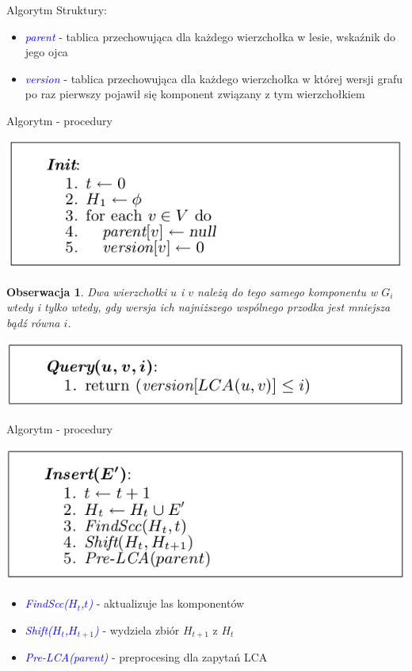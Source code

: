 \documentclass{beamer}
\newtheorem{obs}{Obserwacja}
\newcommand{\emp}[1]{\textcolor{blue}{\textit{#1}}}
\begin{document}
\begin{frame}{Algorytm}
Struktury:
\begin{itemize}
\item \emp{parent} - tablica przechowująca dla każdego wierzchołka w lesie, wskaźnik do jego ojca
\item \emp{version} - tablica przechowująca dla każdego wierzchołka w której wersji grafu po raz pierwszy pojawił się komponent związany z tym wierzchołkiem
\end{itemize}
\end{frame}

\begin{frame}{Algorytm - procedury}
\begin{center}
\includegraphics[scale=0.4]{img/Init.png}
\end{center}

\begin{obs}
Dwa wierzchołki $u$ i $v$ należą do tego samego komponentu w $G_i$ wtedy i tylko wtedy, gdy wersja ich najniższego wspólnego przodka jest mniejsza bądź równa $i$.
\end{obs}

\begin{center}
\includegraphics[scale=0.4]{img/Query.png}
\end{center}
\end{frame}

\begin{frame}{Algorytm - procedury}
\begin{center}
\includegraphics[scale=0.4]{img/Insert.png}
\end{center}

\begin{itemize}
\item \emp{FindScc($H_t$,$t$)} - aktualizuje las komponentów
\item \emp{Shift($H_t$,$H_{t+1}$)} - wydziela zbiór $H_{t+1}$ z $H_t$
\item \emp{Pre-LCA(parent)} - preprocesing dla zapytań LCA
\end{itemize}
\end{frame}
\end{document}
